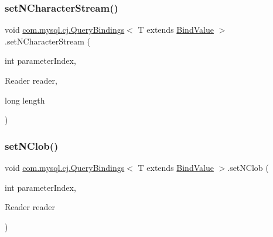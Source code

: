 \subsubsection{\texorpdfstring{set\+N\+Character\+Stream()}{setNCharacterStream()}\hspace{0.1cm}{\footnotesize\ttfamily [2/2]}}
{\footnotesize\ttfamily void \mbox{\hyperlink{interfacecom_1_1mysql_1_1cj_1_1_query_bindings}{com.\+mysql.\+cj.\+Query\+Bindings}}$<$ T extends \mbox{\hyperlink{interfacecom_1_1mysql_1_1cj_1_1_bind_value}{Bind\+Value}} $>$.set\+N\+Character\+Stream (\begin{DoxyParamCaption}\item[{int}]{parameter\+Index,  }\item[{Reader}]{reader,  }\item[{long}]{length }\end{DoxyParamCaption})}

\mbox{\label{interfacecom_1_1mysql_1_1cj_1_1_query_bindings_a42336834f57b9020ee679888278cfd2d}} 
\subsubsection{\texorpdfstring{set\+N\+Clob()}{setNClob()}\hspace{0.1cm}{\footnotesize\ttfamily [1/3]}}
{\footnotesize\ttfamily void \mbox{\hyperlink{interfacecom_1_1mysql_1_1cj_1_1_query_bindings}{com.\+mysql.\+cj.\+Query\+Bindings}}$<$ T extends \mbox{\hyperlink{interfacecom_1_1mysql_1_1cj_1_1_bind_value}{Bind\+Value}} $>$.set\+N\+Clob (\begin{DoxyParamCaption}\item[{int}]{parameter\+Index,  }\item[{Reader}]{reader }\end{DoxyParamCaption})}

\mbox{\label{interfacecom_1_1mysql_1_1cj_1_1_query_bindings_a4f84dc603e3f63e4b8b3adc3672ea9bf}} 
